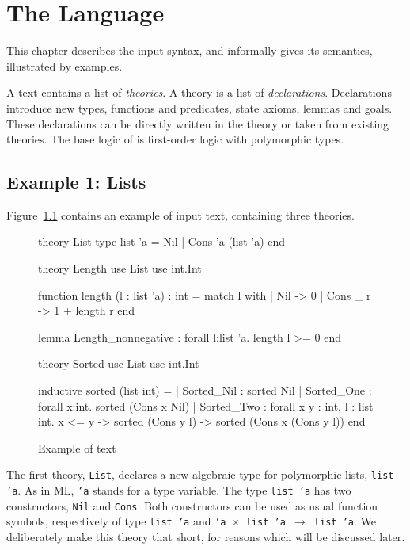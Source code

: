 \chapter{The \why Language}
\label{chap:syntax}

This chapter describes the input syntax, and informally gives its semantics,
illustrated by examples.

A \why text contains a list of \emph{theories}.
A theory is a list of \emph{declarations}. Declarations introduce new
types, functions and predicates, state axioms, lemmas and goals.
These declarations can be directly written in the theory or taken from
existing theories. The base logic of \why is first-order
logic with polymorphic types.

\section{Example 1: Lists}

Figure~\ref{fig:tutorial1} contains an example of \why input
text, containing three theories.

\begin{figure}
\centering
\begin{whycode}
theory List
  type list 'a = Nil | Cons 'a (list 'a)
end

theory Length
  use List
  use int.Int

  function length (l : list 'a) : int =
    match l with
    | Nil      -> 0
    | Cons _ r -> 1 + length r
    end

  lemma Length_nonnegative : forall l:list 'a. length l >= 0
end

theory Sorted
  use List
  use int.Int

  inductive sorted (list int) =
    | Sorted_Nil :
        sorted Nil
    | Sorted_One :
        forall x:int. sorted (Cons x Nil)
    | Sorted_Two :
        forall x y : int, l : list int.
        x <= y -> sorted (Cons y l) -> sorted (Cons x (Cons y l))
end
\end{whycode}
\vspace*{-1em}%
\caption{Example of \why text}
\label{fig:tutorial1}
\end{figure}

The first theory, \texttt{List},
declares a new algebraic type for polymorphic lists, \texttt{list 'a}.
As in ML, \texttt{'a} stands for a type variable.
The type \texttt{list 'a} has two constructors, \texttt{Nil} and
\texttt{Cons}. Both constructors can be used as usual function
symbols, respectively of type \texttt{list 'a} and \texttt{'a
  $\times$ list 'a $\rightarrow$ list 'a}.
We deliberately make this theory that short, for reasons which will be
discussed later.

